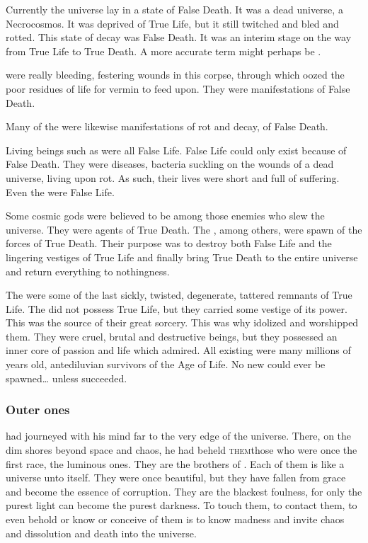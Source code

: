 Currently the universe lay in a state of False Death. 
It was a dead universe, a Necrocosmos.
It was deprived of True Life, but it still twitched and bled and rotted. 
This state of decay was False Death. 
It was an interim stage on the way from True Life to True Death. 
A more accurate term might perhaps be . 

\Dweomers were really bleeding, festering wounds in this corpse, through which oozed the poor residues of life for vermin to feed upon. 
They were manifestations of False Death. 

Many of the  were likewise manifestations of rot and decay, of False Death. 

Living beings such as \Miithians were all False Life. 
False Life could only exist because of False Death. 
They were diseases, bacteria suckling on the wounds of a dead universe, living upon rot. 
As such, their lives were short and full of suffering. 
Even the \voyagers were False Life. 

Some cosmic gods were believed to be among those enemies who slew the universe. 
They were agents of True Death. 
The \banes, among others, were spawn of the forces of True Death.
Their purpose was to destroy both False Life and the lingering vestiges of True Life and finally bring True Death to the entire universe and return everything to nothingness. 

The \xss were some of the last sickly, twisted, degenerate, tattered remnants of True Life. 
The \xss did not possess True Life, but they carried some vestige of its power.
This was the source of their great sorcery. 
This was why \Sethicus idolized and worshipped them. 
They were cruel, brutal and destructive beings, but they possessed an inner core of passion and life which \Sethicus admired. 
All existing \xss were many millions of years old, antediluvian survivors of the Age of Life. 
No new \xss could ever be spawned\ldots{} unless  succeeded.





\subsubsection{Outer ones}
\Sethicus had journeyed with his mind far to the very edge of the universe.
There, on the dim shores beyond space and chaos, he had beheld \textsc{them}\dash those who were once the first race, the luminous ones. 
They are the brothers of \RuinSatha. 
Each of them is like a universe unto itself. 
They were once beautiful, but they have fallen from grace and become the essence of corruption.
They are the blackest foulness, for only the purest light can become the purest darkness. 
To touch them, to contact them, to even behold or know or conceive of them is to know madness and invite chaos and dissolution and death into the universe. 





